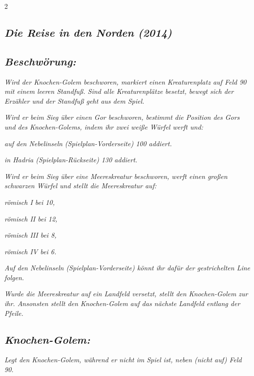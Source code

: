 \documentclass[10pt, a4paper, oneside]{book}
\newcommand{\fan}[1]{\textit{#1}}
\begin{document}
\begin{multicols*}{2}
\begin{bgcolor}
\section{\fan{Die Reise in den Norden (2014)}}


\subsection{\fan{Beschwörung:}}

\fan{Wird der Knochen-Golem beschworen, markiert einen Kreaturenplatz auf Feld 90 mit einem leeren Standfuß. Sind alle Kreaturenplätze besetzt, bewegt sich der Erzähler und der Standfuß geht aus dem Spiel.}

\fan{Wird er beim Sieg über einen Gor beschworen, bestimmt die Position des Gors und des Knochen-Golems, indem ihr zwei weiße Würfel werft und:}

\bullet{} \fan{auf den Nebelinseln (Spielplan-Vorderseite) 100 addiert.}

\bullet{} \fan{in Hadria (Spielplan-Rückseite) 130 addiert.}

\fan{Wird er beim Sieg über eine Meereskreatur beschworen, werft einen großen schwarzen Würfel und stellt die Meereskreatur auf:}

\bullet{} \fan{römisch I bei 10,}

\bullet{} \fan{römisch II bei 12,}

\bullet{} \fan{römisch III bei 8,}

\bullet{} \fan{römisch IV bei 6.}

\fan{Auf den Nebelinseln (Spielplan-Vorderseite) könnt ihr dafür der gestrichelten Line folgen.}

\fan{Wurde die Meereskreatur auf ein Landfeld versetzt, stellt den Knochen-Golem zur ihr. Ansonsten stellt den Knochen-Golem auf das nächste Landfeld entlang der Pfeile.}






\subsection{\fan{Knochen-Golem:}}

\fan{Legt den Knochen-Golem, während er nicht im Spiel ist, neben (nicht auf) Feld 90.}


\end{bgcolor}






\end{multicols*}
\end{document}
